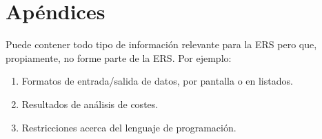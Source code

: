 \documentclass[12pt,a4paper, twosite]{book}
\begin{document}
\newpage


\section{Apéndices}
\label{sec:org75cea03}

Puede contener todo tipo de información relevante para la ERS pero
que, propiamente, no forme parte de la ERS. Por ejemplo:

\begin{enumerate}
\item Formatos de entrada/salida de datos, por pantalla o en listados.

\item Resultados de análisis de costes.

\item Restricciones acerca del lenguaje de programación.
\end{enumerate}
\end{document}
